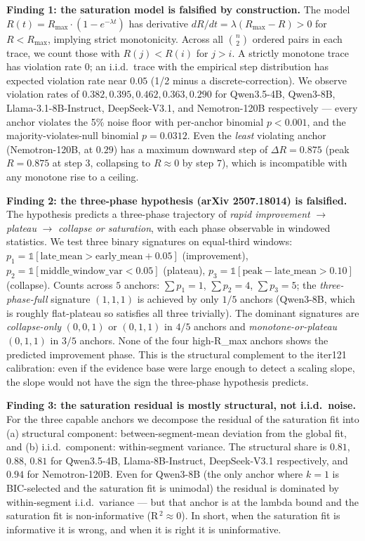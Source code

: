 \textbf{Finding 1: the saturation model is falsified by
construction.}  The model
$R(t) = R_\mathrm{max} \cdot (1 - e^{-\lambda t})$ has derivative
$dR/dt = \lambda (R_\mathrm{max} - R) > 0$ for $R < R_\mathrm{max}$,
implying strict monotonicity.  Across all
$\binom{n}{2}$ ordered pairs in each trace, we count those with
$R(j) < R(i)$ for $j > i$.  A strictly monotone trace has violation
rate $0$; an i.i.d.\ trace with the empirical step distribution has
expected violation rate near $0.05$ (1/2 minus a discrete-correction).
We observe violation rates of $0.382, 0.395, 0.462, 0.363, 0.290$ for
Qwen3.5-4B, Qwen3-8B, Llama-3.1-8B-Instruct, DeepSeek-V3.1, and
Nemotron-120B respectively --- every anchor violates the 5\% noise
floor with per-anchor binomial $p < 0.001$, and the
majority-violates-null binomial $p = 0.0312$.  Even the
\emph{least} violating anchor (Nemotron-120B, at $0.29$) has a
maximum downward step of $\Delta R = 0.875$ (peak $R = 0.875$ at
step $3$, collapsing to $R \approx 0$ by step $7$), which is
incompatible with any monotone rise to a ceiling.

\textbf{Finding 2: the three-phase hypothesis (arXiv 2507.18014)
is falsified.}  The hypothesis predicts a three-phase trajectory of
\emph{rapid improvement} $\to$ \emph{plateau} $\to$ \emph{collapse
or saturation}, with each phase observable in windowed statistics.
We test three binary signatures on equal-third windows:
$p_1 = \mathbb{1}[\mathrm{late\_mean} > \mathrm{early\_mean} + 0.05]$
(improvement), $p_2 = \mathbb{1}[\mathrm{middle\_window\_var} < 0.05]$
(plateau), $p_3 = \mathbb{1}[\mathrm{peak} - \mathrm{late\_mean} > 0.10]$
(collapse).  Counts across $5$ anchors:
$\sum p_1 = 1$, $\sum p_2 = 4$, $\sum p_3 = 5$; the
\emph{three-phase-full} signature $(1,1,1)$ is achieved by only
$1/5$ anchors (Qwen3-8B, which is roughly flat-plateau so satisfies
all three trivially).  The dominant signatures are
\emph{collapse-only} $(0,0,1)$ or $(0,1,1)$ in $4/5$ anchors and
\emph{monotone-or-plateau} $(0,1,1)$ in $3/5$ anchors.  None of
the four high-R_max anchors shows the predicted improvement phase.
This is the structural complement to the iter121 calibration: even if
the evidence base were large enough to detect a scaling slope, the
slope would not have the sign the three-phase hypothesis predicts.

\textbf{Finding 3: the saturation residual is mostly structural,
not i.i.d.\ noise.}  For the three capable anchors we decompose the
residual of the saturation fit into (a) structural component:
between-segment-mean deviation from the global fit, and (b) i.i.d.\
component: within-segment variance.  The structural share is
$0.81$, $0.88$, $0.81$ for Qwen3.5-4B, Llama-8B-Instruct,
DeepSeek-V3.1 respectively, and $0.94$ for Nemotron-120B.  Even for
Qwen3-8B (the only anchor where $k=1$ is BIC-selected and the
saturation fit is unimodal) the residual is dominated by within-segment
i.i.d.\ variance --- but that anchor is at the lambda bound and the
saturation fit is non-informative (R$^{\,2} \approx 0$).  In short,
when the saturation fit is informative it is wrong, and when it is
right it is uninformative.

